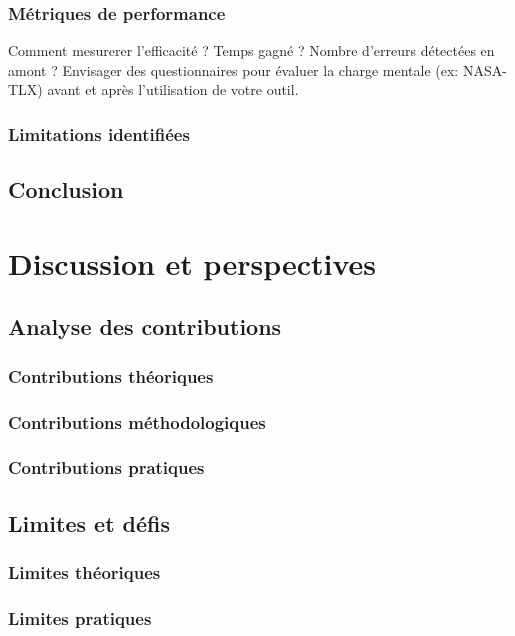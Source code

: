 \documentclass[a4paper,12pt]{article}
\begin{document}
\subsubsection{Métriques de performance}
\label{sec:org0dea8f7}
Comment mesurerer l'efficacité ? Temps gagné ? Nombre d'erreurs détectées en amont ?
Envisager des questionnaires pour évaluer la charge mentale (ex: NASA-TLX) avant et après l'utilisation de votre outil.
\subsubsection{Limitations identifiées}
\label{sec:org776652c}
\subsection{Conclusion}
\label{sec:org49bc44a}
\clearpage
\section{Discussion et perspectives}
\label{sec:org6c47568}
\subsection{Analyse des contributions}
\label{sec:org6562d93}
\subsubsection{Contributions théoriques}
\label{sec:orge2ff280}
\subsubsection{Contributions méthodologiques}
\label{sec:orge01dbef}
\subsubsection{Contributions pratiques}
\label{sec:orgb05c284}
\subsection{Limites et défis}
\label{sec:orgd37c384}
\subsubsection{Limites théoriques}
\label{sec:org849a840}
\subsubsection{Limites pratiques}
\label{sec:orgf4f3f0b}
\end{document}
